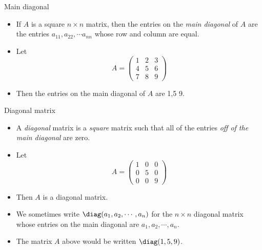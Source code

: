 \documentclass{beamer}
\begin{document}
\begin{frame}{Main diagonal}

\begin{itemize}
\item If $A$ is a square $n\times n$ matrix, then the entries on the
\emph{main diagonal} of $A$ are the entries $a_{11}, a_{22}, \cdots a_{nn}$
whose row and column are equal.
\item Let
$$A =
\begin{pmatrix}
1 & 2 & 3 \\
4 & 5 & 6 \\
7 & 8 & 9
\end{pmatrix}
$$
\item Then the entries on the main diagonal of $A$ are 1,5 9.
\end{itemize}

\end{frame}


\begin{frame}{Diagonal matrix}

\begin{itemize}
\item A \emph{diagonal} matrix is a \emph{square} matrix such that all
of the entries \emph{off of the main diagonal} are zero.
\item Let
$$A =
\begin{pmatrix}
1 & 0 & 0 \\
0 & 5 & 0 \\
0 & 0 & 9
\end{pmatrix}
$$
\item Then $A$ is a diagonal matrix.
\item We sometimes write $\diag(a_1,a_2,\cdots, a_n)$ for the $n\times n$
diagonal matrix whose entries on the main diagonal are $a_1,a_2,\cdots, a_n$.
\item The matrix $A$ above would be written $\diag(1,5,9)$.
\end{itemize}

\end{frame}

\end{document}

